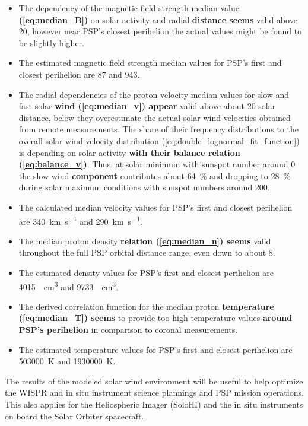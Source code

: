 \begin{itemize}
	\item The dependency of the magnetic field strength median value \textbf{(\ref{eq:median_B})} on solar activity and radial \textbf{distance seems} valid above \SI{20}{\Rs}, however near PSP's closest perihelion the actual values might be found to be slightly higher.
	\item The estimated magnetic field strength median values for PSP's first and closest perihelion are \SI{87}{\nT} and \SI{943}{\nT}.
	\item The radial dependencies of the proton velocity median values for slow and fast solar \textbf{wind (\ref{eq:median_v}) appear} valid above about \SI{20}{\Rs} solar distance, below they overestimate the actual solar wind velocities obtained from remote measurements. The share of their frequency distributions to the overall solar wind velocity distribution (\ref{eq:double_lognormal_fit_function}) is depending on solar activity \textbf{with their balance relation (\ref{eq:balance_v})}. Thus, at solar minimum with sunspot number around 0 the slow wind \textbf{component} contributes about \SI{64}{\%} and dropping to \SI{28}{\%} during solar maximum conditions with sunspot numbers around 200.
	\item The calculated median velocity values for PSP's first and closest perihelion are \SI{340}{\km\per\s} and \SI{290}{\km\per\s}.
	\item The median proton density \textbf{relation (\ref{eq:median_n}) seems} valid throughout the full PSP orbital distance range, even down to about \SI{8}{\Rs}.
	\item The estimated density values for PSP's first and closest perihelion are \SI{4015}{\per\cm\cubed} and \SI{9733}{\per\cm\cubed}.
	\item The derived correlation function for the median proton \textbf{temperature (\ref{eq:median_T}) seems} to provide too high temperature values \textbf{around PSP’s perihelion} in comparison to coronal measurements.
	\item The estimated temperature values for PSP's first and closest perihelion are \SI{503000}{\K} and \SI{1930000}{\K}.
\end{itemize}

The results of the modeled solar wind environment will be useful to help optimize the WISPR and in situ instrument science plannings and PSP mission operations. This also applies for the Heliospheric Imager (SoloHI) \citep{Howard2013} and the in situ instruments on board the Solar Orbiter spacecraft.

